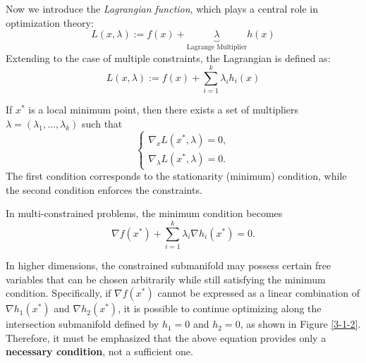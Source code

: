 \documentclass[../main]{subfiles}
\begin{document}
Now we introduce the \emph{Lagrangian function}, which plays a central role in optimization theory:
\begin{equation}
    L(x, \lambda) := f(x) + \underbrace{\lambda}_{\text{Lagrange Multiplier}} h(x)
\end{equation}
Extending to the case of multiple constraints, the Lagrangian is defined as:
\begin{equation}
    L(x,\lambda) := f(x) + \sum_{i=1}^k \lambda_i h_i(x)
\end{equation}

\begin{theorem}
    If $x^*$ is a local minimum point, then there exists a set of multipliers $\lambda = (\lambda_1,\dots,\lambda_k)$ such that
    \begin{equation}
        \begin{cases}
            \nabla_x L(x^*, \lambda) = 0, \\
            \nabla_\lambda L(x^*, \lambda) = 0.
        \end{cases}
    \end{equation}
    The first condition corresponds to the stationarity (minimum) condition, while the second condition enforces the constraints.
\end{theorem}

\begin{corollary}
    In multi-constrained problems, the minimum condition becomes
    \begin{equation}
        \nabla f(x^*) + \sum_{i=1}^k \lambda_i \nabla h_i(x^*) = 0.
    \end{equation}
\end{corollary}
\begin{remark}
    In higher dimensions, the constrained submanifold may possess certain free variables that can be chosen arbitrarily while still satisfying the minimum condition. 
    Specifically, if $\nabla f(x^*)$ cannot be expressed as a linear combination of $\nabla h_1(x^*)$ and $\nabla h_2(x^*)$, it is possible to continue optimizing along the intersection submanifold defined by $h_1=0$ and $h_2=0$, as shown in Figure \ref{3-1-2}.  
    Therefore, it must be emphasized that the above equation provides only a \textbf{necessary condition}, not a sufficient one. 
\end{remark}
\end{document}
